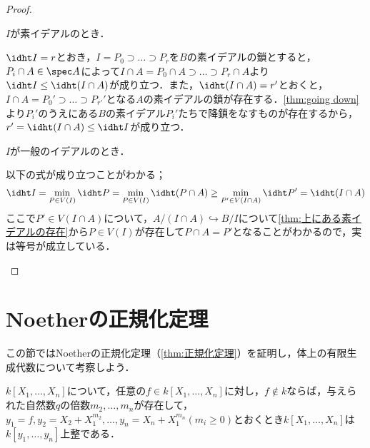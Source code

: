 \begin{proof}
	\begin{step}
		\item $I$が素イデアルのとき．
		
		$\idht I=r$とおき，$I=P_0\supset\dots\supset P_r$を$B$の素イデアルの鎖とすると，$P_i\cap A\in\spec A$によって$I\cap A=P_0\cap A\supset\dots\supset P_r\cap A$より$\idht I\leq \idht (I\cap A)$が成り立つ．また，$\idht (I\cap A)=r'$とおくと，$I\cap A=P_0'\supset\dots\supset P_{r'}'$となる$A$の素イデアルの鎖が存在する．\ref{thm:going down}より$P_i'$のうえにある$B$の素イデアル$P_i'$たちで降鎖をなすものが存在するから，$r'=\idht(I\cap A)\leq\idht I$が成り立つ．
		
		\item $I$が一般のイデアルのとき．
		
		以下の式が成り立つことがわかる；
		\[\idht I=\min_{P\in V(I)}\idht P=\min_{P\in V(I)}\idht (P\cap A)\geq\min_{P'\in V(I\cap A)}\idht P'=\idht (I\cap A)\]
		ここで$P'\in V(I\cap A)$について，$A/(I\cap A)\hookrightarrow B/I$について\ref{thm:上にある素イデアルの存在}から$P\in V(I)$が存在して$P\cap A=P'$となることがわかるので，実は等号が成立している．
	\end{step}
\end{proof}

\section{Noetherの正規化定理}
この節ではNoetherの正規化定理（\ref{thm:正規化定理}）を証明し，体上の有限生成代数について考察しよう．
%
%
%

\begin{lem}\label{lem:正規化の補題1}
	$k[X_1,\dots,X_n]$について，任意の$f\in k[X_1,\dots,X_n]$に対し，$f\not\in k$ならば，与えられた自然数$q$の倍数$m_2,\dots,m_n$が存在して，$y_1=f,y_2=X_2+X_1^{m_2},\dots,y_n=X_n+X_1^{m_n} (m_i\geq0)$とおくとき$k[X_1,\dots,X_n]$は$k[y_1,\dots,y_n]$上整である．
\end{lem}

